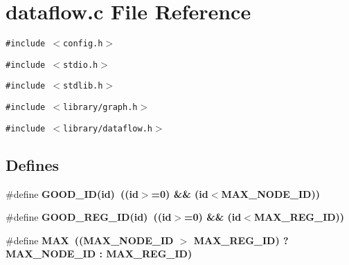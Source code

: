 \section{dataflow.c File Reference}
\label{dataflow_8c}
{\tt \#include $<$config.h$>$}\par
{\tt \#include $<$stdio.h$>$}\par
{\tt \#include $<$stdlib.h$>$}\par
{\tt \#include $<$library/graph.h$>$}\par
{\tt \#include $<$library/dataflow.h$>$}\par
\subsection*{Defines}
\begin{CompactItemize}
\item 
\#define \bf{GOOD\_\-ID}(id)~((id$>$=0) \&\& (id$<$MAX\_\-NODE\_\-ID))
\item 
\#define \bf{GOOD\_\-REG\_\-ID}(id)~((id$>$=0) \&\& (id$<$MAX\_\-REG\_\-ID))
\item 
\#define \bf{MAX}~((MAX\_\-NODE\_\-ID $>$ MAX\_\-REG\_\-ID) ? MAX\_\-NODE\_\-ID : MAX\_\-REG\_\-ID)
\end{CompactItemize}
